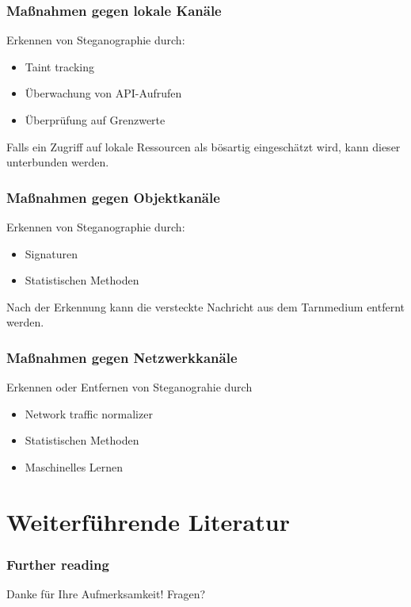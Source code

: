 \documentclass{beamer}
\begin{document}
\begin{frame}
  \frametitle{Maßnahmen gegen lokale Kanäle}
  Erkennen von Steganographie durch:
  \begin{itemize}
    \item Taint tracking
    \item Überwachung von API-Aufrufen
    \item Überprüfung auf Grenzwerte
  \end{itemize}
  Falls ein Zugriff auf lokale Ressourcen als bösartig eingeschätzt wird, kann dieser unterbunden werden.
\end{frame}

\begin{frame}
  \frametitle{Maßnahmen gegen Objektkanäle}
  Erkennen von Steganographie durch:
  \begin{itemize}
    \item Signaturen
    \item Statistischen Methoden
  \end{itemize}
  Nach der Erkennung kann die versteckte Nachricht aus dem Tarnmedium entfernt werden.
\end{frame}

\begin{frame}
  \frametitle{Maßnahmen gegen Netzwerkkanäle}
  Erkennen oder Entfernen von Steganograhie durch
  \begin{itemize}
    \item Network traffic normalizer
    \item Statistischen Methoden
    \item Maschinelles Lernen
  \end{itemize}
\end{frame}

\section{Weiterführende Literatur}
  \begin{frame}[allowframebreaks]
  \frametitle{Further reading}    
  \begin{thebibliography}{10}    
  \beamertemplatearticlebibitems
    
  \end{thebibliography}
  \end{frame}
  
\begin{frame}
	\centering Danke für Ihre Aufmerksamkeit!
	\centering Fragen?
\end{frame}
\end{document}

